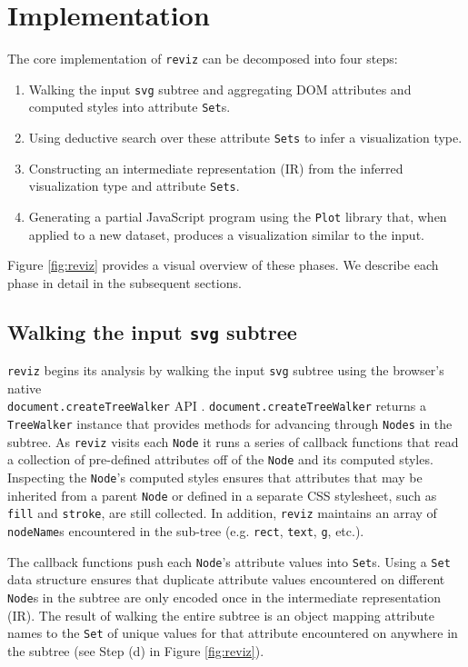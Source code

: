 \documentclass[acmsmall,screen,nonacm]{acmart}
\newcommand{\code}[1]{\texttt{#1}}
\begin{document}
\section{Implementation}

The core implementation of \code{reviz} can be decomposed into four steps:

\begin{enumerate}
  \item Walking the input \code{svg} subtree and aggregating DOM attributes and computed styles into attribute \code{Set}s.
  \item Using deductive search over these attribute \code{Sets} to infer a visualization type.
  \item Constructing an intermediate representation (IR) from the inferred visualization type and attribute \code{Sets}.
  \item Generating a partial JavaScript program using the \code{Plot} \cite{observable_plot:2021} library that, when applied to a new dataset, produces a visualization similar to the input.
\end{enumerate}

Figure \ref{fig:reviz} provides a visual overview of these phases. We describe each phase in detail in the subsequent sections.

\subsection{Walking the input \code{svg} subtree}

\code{reviz} begins its analysis by walking the input \code{svg} subtree using the browser's native \\ \code{document.createTreeWalker} API \cite{createTreeWalker_mozilla:2021}. \code{document.createTreeWalker} returns a \code{TreeWalker} instance that provides methods for advancing through \code{Nodes} in the subtree. As \code{reviz} visits each \code{Node} it runs a series of callback functions that read a collection of pre-defined attributes off of the \code{Node} and its computed styles. Inspecting the \code{Node}'s computed styles ensures that attributes that may be inherited from a parent \code{Node} or defined in a separate CSS stylesheet, such as \code{fill} and \code{stroke}, are still collected. In addition, \code{reviz} maintains an array of \code{nodeName}s encountered in the sub-tree (e.g. \code{rect}, \code{text}, \code{g}, etc.).

The callback functions push each \code{Node}'s attribute values into \code{Set}s. Using a \code{Set} data structure ensures that duplicate attribute values encountered on different \code{Node}s in the subtree are only encoded once in the intermediate representation (IR). The result of walking the entire subtree is an object mapping attribute names to the \code{Set} of unique values for that attribute encountered on anywhere in the subtree (see Step (d) in Figure \ref{fig:reviz}).
\end{document}
